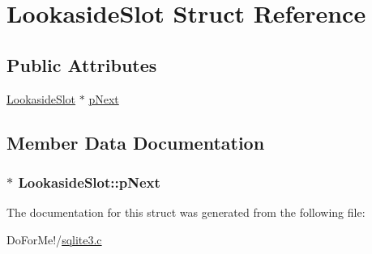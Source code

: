 \hypertarget{struct_lookaside_slot}{\section{Lookaside\-Slot Struct Reference}
\label{struct_lookaside_slot}
}
\subsection*{Public Attributes}
\begin{DoxyCompactItemize}
\item 
\hyperlink{struct_lookaside_slot}{Lookaside\-Slot} $\ast$ \hyperlink{struct_lookaside_slot_a3c3dd4a770ded51a68e8a651eba40f66}{p\-Next}
\end{DoxyCompactItemize}


\subsection{Member Data Documentation}
\hypertarget{struct_lookaside_slot_a3c3dd4a770ded51a68e8a651eba40f66}{
\subsubsection[{p\-Next}]{$\ast$ Lookaside\-Slot\-::p\-Next}}\label{struct_lookaside_slot_a3c3dd4a770ded51a68e8a651eba40f66}


The documentation for this struct was generated from the following file\-:\begin{DoxyCompactItemize}
\item 
Do\-For\-Me!/\hyperlink{sqlite3_8c}{sqlite3.\-c}\end{DoxyCompactItemize}
